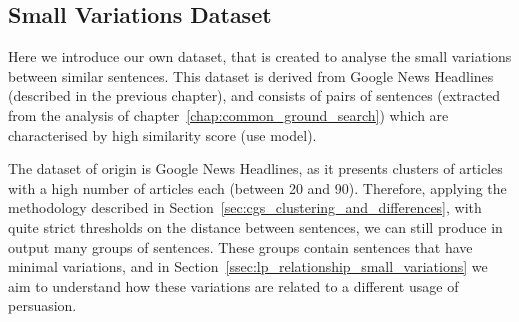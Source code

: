 \subsection{Small Variations Dataset}
\label{ssec:lp_relationship_small_variations_data}

Here we introduce our own dataset, that is created to analyse the small variations between similar sentences.
This dataset is derived from Google News Headlines (described in the previous chapter), and consists of pairs of sentences (extracted from the analysis of chapter~\ref{chap:common_ground_search}) which are characterised by high similarity score (\acrshort{use} model).

The dataset of origin is Google News Headlines, as it presents clusters of articles with a high number of articles each (between 20 and 90). Therefore, applying the methodology described in Section~\ref{sec:cgs_clustering_and_differences}, with quite strict thresholds on the distance between sentences, we can still produce in output many groups of sentences. These groups contain sentences that have minimal variations, and in Section~\ref{ssec:lp_relationship_small_variations} we aim to understand how these variations are related to a different usage of persuasion.

